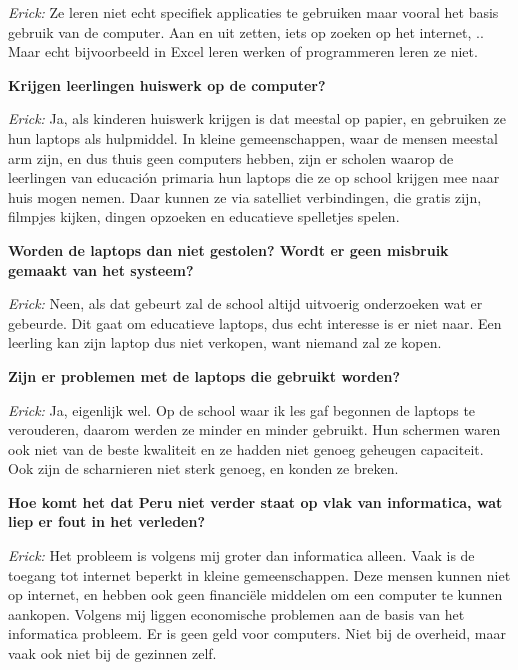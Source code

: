 \textit{Erick:} Ze leren niet echt specifiek applicaties te gebruiken maar vooral het basis gebruik van de computer. Aan en uit zetten, iets op zoeken op het internet, .. Maar echt bijvoorbeeld in Excel leren werken of programmeren leren ze niet.

\textbf{Krijgen leerlingen huiswerk op de computer?}

\textit{Erick:} Ja, als kinderen huiswerk krijgen is dat meestal op papier, en gebruiken ze hun laptops als hulpmiddel. In kleine gemeenschappen, waar de mensen meestal arm zijn, en dus thuis geen computers hebben, zijn er scholen waarop de leerlingen van educación primaria hun laptops die ze op school krijgen mee naar huis mogen nemen. Daar kunnen ze via satelliet verbindingen, die gratis zijn, filmpjes kijken, dingen opzoeken en educatieve spelletjes spelen. 

\textbf{Worden de laptops dan niet gestolen? Wordt er geen misbruik gemaakt van het systeem?}

\textit{Erick:} Neen, als dat gebeurt zal de school altijd uitvoerig onderzoeken wat er gebeurde. Dit gaat om educatieve laptops, dus echt interesse is er niet naar. Een leerling kan zijn laptop dus niet verkopen, want niemand zal ze kopen. 

\textbf{Zijn er problemen met de laptops die gebruikt worden?}

\textit{Erick:} Ja, eigenlijk wel. Op de school waar ik les gaf begonnen de laptops te verouderen, daarom werden ze minder en minder gebruikt. Hun schermen waren ook niet van de beste kwaliteit en ze hadden niet genoeg geheugen capaciteit. Ook zijn de scharnieren niet sterk genoeg, en konden ze breken.

\textbf{Hoe komt het dat Peru niet verder staat op vlak van informatica, wat liep er fout in het verleden?}

\textit{Erick:} Het probleem is volgens mij groter dan informatica alleen. Vaak is de toegang tot internet beperkt in kleine gemeenschappen. Deze mensen kunnen niet op internet, en hebben ook geen financiële middelen om een computer te kunnen aankopen. Volgens mij liggen economische problemen aan de basis van het informatica probleem. Er is geen geld voor computers. Niet bij de overheid, maar vaak ook niet bij de gezinnen zelf. 

